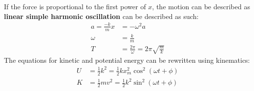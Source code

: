 \documentclass[../AP_Physics_C.tex]{subfiles}
\begin{document}
				If the force is proportional to the first power of $x$, the motion can be described as \textbf{linear simple harmonic oscillation} can be described as such:
				\begin{align*}
					a = \frac{-k}{m}x &= -\omega^2 a \\
					\omega &= \frac{k}{m} \\
					T &= \frac{2\pi}{\omega} = 2\pi\sqrt{\frac{m}{k}}
				\end{align*}
				The equations for kinetic and potential energy can be rewritten using kinematics:
				\begin{align*}
					U &= \frac{1}{2}k^2 = \frac{1}{2}kx_m^2\cos^2(\omega t + \phi) \\
					K &= \frac{1}{2}mv^2 = \frac{1}{2}k^2\sin^2(\omega t + \phi)
				\end{align*}
\end{document}
